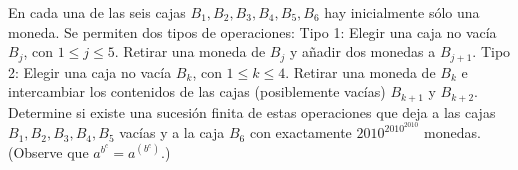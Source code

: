 En cada una de las seis cajas $B_1, B_2, B_3, B_4, B_5, B_6$ hay inicialmente sólo una moneda. Se permiten dos tipos de operaciones: \newline 
Tipo 1: Elegir una caja no vacía $B_j$, con $1 \leq j \leq 5$. Retirar una moneda de $B_j$ y añadir dos monedas a $B_{j+1}$. \newline 
Tipo 2: Elegir una caja no vacía $B_k$, con $1 \leq k \leq 4$. Retirar una moneda de $B_k$ e intercambiar los contenidos de las cajas (posiblemente vacías) $B_{k+1}$ y $B_{k+2}$. \newline 
Determine si existe una sucesión finita de estas operaciones que deja a las cajas $B_1,B_2,B_3,B_4,B_5$ vacías y a la caja $B_6$ con exactamente $2010^{2010^{2010}}$ monedas. (Observe que $a^{b^{c}} = a^{(b^c)}$.)